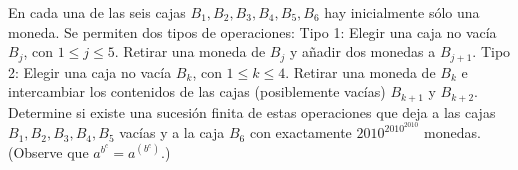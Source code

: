 En cada una de las seis cajas $B_1, B_2, B_3, B_4, B_5, B_6$ hay inicialmente sólo una moneda. Se permiten dos tipos de operaciones: \newline 
Tipo 1: Elegir una caja no vacía $B_j$, con $1 \leq j \leq 5$. Retirar una moneda de $B_j$ y añadir dos monedas a $B_{j+1}$. \newline 
Tipo 2: Elegir una caja no vacía $B_k$, con $1 \leq k \leq 4$. Retirar una moneda de $B_k$ e intercambiar los contenidos de las cajas (posiblemente vacías) $B_{k+1}$ y $B_{k+2}$. \newline 
Determine si existe una sucesión finita de estas operaciones que deja a las cajas $B_1,B_2,B_3,B_4,B_5$ vacías y a la caja $B_6$ con exactamente $2010^{2010^{2010}}$ monedas. (Observe que $a^{b^{c}} = a^{(b^c)}$.)